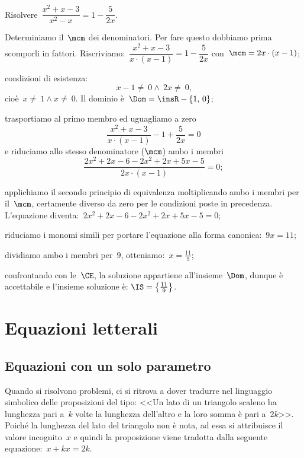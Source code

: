 \begin{exrig}
 \begin{esempio}
Risolvere~$\dfrac{x^{2}+x-3}{x^{2}-x}=1-\dfrac{5}{2x}$.
\end{esempio}

\begin{enumeratea}
 \item Determiniamo il~$\mcm$ dei denominatori. Per fare questo dobbiamo prima scomporli in fattori.
    Riscriviamo:~$\dfrac{x^{2}+x-3}{x\cdot (x-1)}=1-\dfrac{5}{2x}$ con~$\mcm=2x\cdot (x-1)$;
 \item condizioni di esistenza: \[x-1\neq~0\wedge~2x\neq~0\text{,}\] cioè~$x\neq~1\wedge x\neq~0$. Il dominio è~$\Dom=\insR-\{1\text{,~}0\}$;
 \item trasportiamo al primo membro ed uguagliamo a zero \[\frac{x^{2}+x-3}{x\cdot (x-1)}-1+\frac{5}{2x}=0\]
    e riduciamo allo stesso denominatore ($\mcm$) ambo i membri \[\frac{2x^{2}+2x-6-2x^{2}+2x+5x-5}{2x\cdot (x-1)}=0;\]
 \item applichiamo il secondo principio di equivalenza moltiplicando ambo i membri per il~$\mcm$,
    certamente diverso da zero per le condizioni poste in precedenza. L'equazione diventa:~$2x^{2}+2x-6-2x^{2}+2x+5x-5=0$;
 \item riduciamo i monomi simili per portare l'equazione alla forma canonica:~$9x=11$;
 \item dividiamo ambo i membri per~$9$, otteniamo:~$x=\frac{11}{9}$;
 \item confrontando con le~$\CE$, la soluzione appartiene all'insieme~$\Dom$, dunque è accettabile e l'insieme soluzione è:
    $\IS=\left\{\frac{11}{9}\right\}$.
\end{enumeratea}

\end{exrig}

\ovalbox{\risolvii \ref{ese:17.15}, \ref{ese:17.16}, \ref{ese:17.17}, \ref{ese:17.18}, \ref{ese:17.19}, \ref{ese:17.20}, \ref{ese:17.21}, \ref{ese:17.22}, \ref{ese:17.23}, \ref{ese:17.24}, \ref{ese:17.25}}

\vspazio\ovalbox{\ref{ese:17.26}, \ref{ese:17.27}, \ref{ese:17.28}, \ref{ese:17.29}, \ref{ese:17.30}, \ref{ese:17.31}, \ref{ese:17.32}, \ref{ese:17.33}, \ref{ese:17.34}, \ref{ese:17.35}, \ref{ese:17.36}, \ref{ese:17.37}}

\section{Equazioni letterali}

\subsection{Equazioni con un solo parametro}
Quando si risolvono problemi, ci si ritrova a dover tradurre nel linguaggio simbolico delle proposizioni del tipo:
<<Un lato di un triangolo scaleno ha lunghezza pari a~$k$ volte la lunghezza dell'altro e la loro somma è pari a~$2k$>>.
Poiché la lunghezza del lato del triangolo non è nota, ad essa si attribuisce il valore incognito~$x$ e quindi la proposizione
viene tradotta dalla seguente equazione:~$x+kx=2k$.

